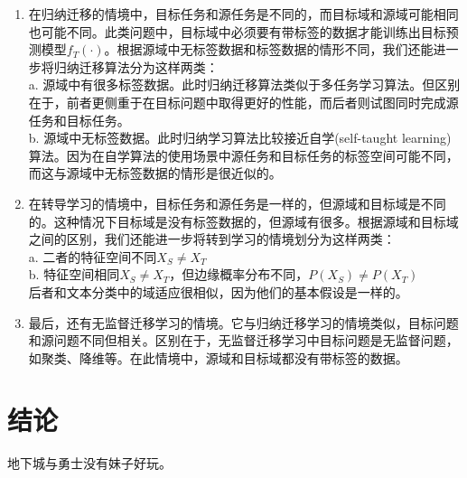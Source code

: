 \documentclass[10pt,journal,compsoc]{IEEEtran}
\begin{document}
\begin{enumerate}
\item 在归纳迁移的情境中，目标任务和源任务是不同的，而目标域和源域可能相同也可能不同。此类问题中，目标域中必须要有带标签的数据才能训练出目标预测模型$f_T(\cdot)$。根据源域中无标签数据和标签数据的情形不同，我们还能进一步将归纳迁移算法分为这样两类：\\
a. 源域中有很多标签数据。此时归纳迁移算法类似于多任务学习算法。但区别在于，前者更侧重于在目标问题中取得更好的性能，而后者则试图同时完成源任务和目标任务。\\
b. 源域中无标签数据。此时归纳学习算法比较接近自学(self-taught learning)算法。因为在自学算法的使用场景中源任务和目标任务的标签空间可能不同，而这与源域中无标签数据的情形是很近似的。

\item 在转导学习的情境中，目标任务和源任务是一样的，但源域和目标域是不同的。这种情况下目标域是没有标签数据的，但源域有很多。根据源域和目标域之间的区别，我们还能进一步将转到学习的情境划分为这样两类：\\
a. 二者的特征空间不同$X_S \ne X_T$\\
b. 特征空间相同$X_S \ne X_T$，但边缘概率分布不同，$P(X_S) \ne P(X_T)$\\
后者和文本分类中的域适应很相似，因为他们的基本假设是一样的。
\item 最后，还有无监督迁移学习的情境。它与归纳迁移学习的情境类似，目标问题和源问题不同但相关。区别在于，无监督迁移学习中目标问题是无监督问题，如聚类、降维等。在此情境中，源域和目标域都没有带标签的数据。
\end{enumerate}




\section{结论}

地下城与勇士没有妹子好玩。



\end{document}

